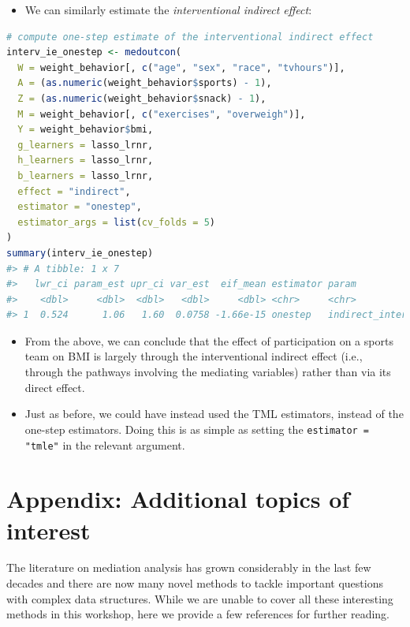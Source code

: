 \documentclass[
  12pt,
]{book}
\newcommand{\passthrough}[1]{#1}
\providecommand{\tightlist}{%
  \setlength{\itemsep}{0pt}\setlength{\parskip}{0pt}}
\theoremstyle{definition}
\theoremstyle{definition}
\theoremstyle{definition}
\newcommand{\1}{\mathbbm{1}}
\begin{document}
\begin{itemize}
\tightlist
\item
  We can similarly estimate the \emph{interventional indirect effect}:
\end{itemize}

\begin{lstlisting}[language=R]
# compute one-step estimate of the interventional indirect effect
interv_ie_onestep <- medoutcon(
  W = weight_behavior[, c("age", "sex", "race", "tvhours")],
  A = (as.numeric(weight_behavior$sports) - 1),
  Z = (as.numeric(weight_behavior$snack) - 1),
  M = weight_behavior[, c("exercises", "overweigh")],
  Y = weight_behavior$bmi,
  g_learners = lasso_lrnr,
  h_learners = lasso_lrnr,
  b_learners = lasso_lrnr,
  effect = "indirect",
  estimator = "onestep",
  estimator_args = list(cv_folds = 5)
)
summary(interv_ie_onestep)
#> # A tibble: 1 x 7
#>   lwr_ci param_est upr_ci var_est  eif_mean estimator param                  
#>    <dbl>     <dbl>  <dbl>   <dbl>     <dbl> <chr>     <chr>                  
#> 1  0.524      1.06   1.60  0.0758 -1.66e-15 onestep   indirect_interventional
\end{lstlisting}

\begin{itemize}
\tightlist
\item
  From the above, we can conclude that the effect of participation on a sports
  team on BMI is largely through the interventional indirect effect (i.e.,
  through the pathways involving the mediating variables) rather than via its
  direct effect.
\item
  Just as before, we could have instead used the TML estimators, instead of the
  one-step estimators. Doing this is as simple as setting the
  \passthrough{\lstinline!estimator = "tmle"!} in the relevant argument.
\end{itemize}

\hypertarget{appendix-additional-topics-of-interest}{%
\chapter{Appendix: Additional topics of interest}\label{appendix-additional-topics-of-interest}}

The literature on mediation analysis has grown considerably in the last few
decades and there are now many novel methods to tackle important questions with
complex data structures. While we are unable to cover all these interesting
methods in this workshop, here we provide a few references for further reading.
\end{document}
